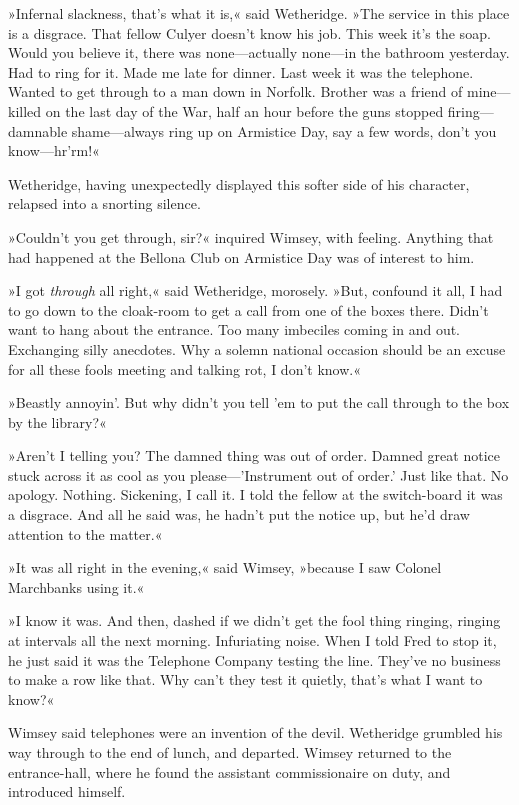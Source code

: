 »Infernal slackness, that's what it is,« said Wetheridge. »The service in this place is a disgrace. That fellow Culyer doesn't know his job. This week it's the soap. Would you believe it, there was none—actually none—in the bathroom yesterday. Had to ring for it. Made me late for dinner. Last week it was the telephone. Wanted to get through to a man down in Norfolk. Brother was a friend of mine—killed on the last day of the War, half an hour before the guns stopped firing—damnable shame—always ring up on Armistice Day, say a few words, don't you know—hr'rm!«

Wetheridge, having unexpectedly displayed this softer side of his character, relapsed into a snorting silence.

»Couldn't you get through, sir?« inquired Wimsey, with feeling. Anything that had happened at the Bellona Club on Armistice Day was of interest to him.

»I got \textit{through} all right,« said Wetheridge, morosely. »But, confound it all, I had to go down to the cloak-room to get a call from one of the boxes there. Didn't want to hang about the entrance. Too many imbeciles coming in and out. Exchanging silly anecdotes. Why a solemn national occasion should be an excuse for all these fools meeting and talking rot, I don't know.«

»Beastly annoyin'. But why didn't you tell 'em to put the call through to the box by the library?«

»Aren't I telling you? The damned thing was out of order. Damned great notice stuck across it as cool as you please—'Instrument out of order.' Just like that. No apology. Nothing. Sickening, I call it. I told the fellow at the switch-board it was a disgrace. And all he said was, he hadn't put the notice up, but he'd draw attention to the matter.«

»It was all right in the evening,« said Wimsey, »because I saw Colonel Marchbanks using it.«

»I know it was. And then, dashed if we didn't get the fool thing ringing, ringing at intervals all the next morning. Infuriating noise. When I told Fred to stop it, he just said it was the Telephone Company testing the line. They've no business to make a row like that. Why can't they test it quietly, that's what I want to know?«

Wimsey said telephones were an invention of the devil. Wetheridge grumbled his way through to the end of lunch, and departed. Wimsey returned to the entrance-hall, where he found the assistant commissionaire on duty, and introduced himself.

